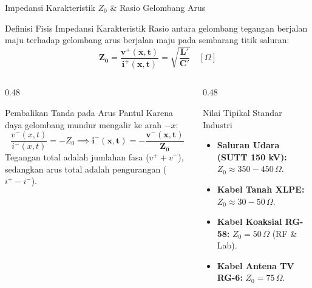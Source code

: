 \documentclass[aspectratio=169,10pt]{beamer}
\begin{document}
\begin{frame}{Impedansi Karakteristik $Z_0$ \& Rasio Gelombang Arus}
  \begin{block}{Definisi Fisis Impedansi Karakteristik}
    \small
    Rasio antara gelombang tegangan berjalan maju terhadap gelombang arus berjalan maju pada sembarang titik saluran:
    \begin{equation*}
      \mathbf{Z_0 = \frac{v^+(x, t)}{i^+(x, t)} = \sqrt{\frac{L'}{C'}}} \quad [\Omega]
    \end{equation*}
  \end{block}
  \begin{columns}[t]
    \begin{column}{0.48\textwidth}
      \begin{alertblock}{Pembalikan Tanda pada Arus Pantul}
        \small
        Karena daya gelombang mundur mengalir ke arah $-x$:
        \begin{equation*}
          \frac{v^-(x, t)}{i^-(x, t)} = -Z_0 \implies \mathbf{i^-(x, t) = -\frac{v^-(x, t)}{Z_0}}
        \end{equation*}
        Tegangan total adalah jumlahan fasa ($v^+ + v^-$), sedangkan arus total adalah pengurangan ($i^+ - i^-$).
      \end{alertblock}
    \end{column}
    \begin{column}{0.48\textwidth}
      \begin{exampleblock}{Nilai Tipikal Standar Industri}
        \small
        \begin{itemize}
          \item \textbf{Saluran Udara (SUTT 150 kV):} $Z_0 \approx 350 - 450\,\Omega$.
          \item \textbf{Kabel Tanah XLPE:} $Z_0 \approx 30 - 50\,\Omega$.
          \item \textbf{Kabel Koaksial RG-58:} $Z_0 = 50\,\Omega$ (RF \& Lab).
          \item \textbf{Kabel Antena TV RG-6:} $Z_0 = 75\,\Omega$.
        \end{itemize}
      \end{exampleblock}
    \end{column}
  \end{columns}
\end{frame}
\end{document}
